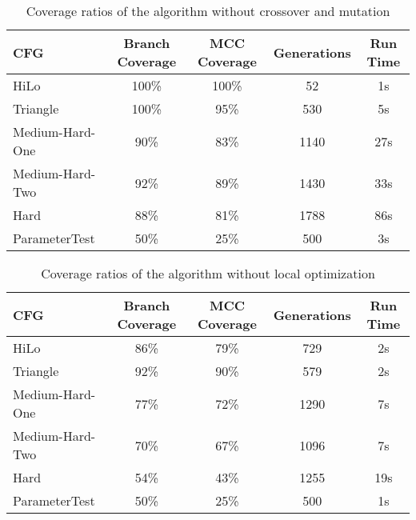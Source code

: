 \documentclass[runningheads]{llncs}
\begin{document}
\begin{table}[h!]
	\begin{center}
		\begin{tabular}{| l | c | c | c | c |}
			\hline
			CFG             & Branch Coverage & MCC Coverage & Generations & Run Time \\ \hline
			HiLo            & 100\%           & 100\%        & 52          & 1s       \\ \hline
			Triangle        & 100\%           & 95\%         & 530         & 5s       \\ \hline
			Medium-Hard-One & 90\%            & 83\%         & 1140        & 27s      \\ \hline
			Medium-Hard-Two & 92\%            & 89\%         & 1430        & 33s      \\ \hline
			Hard            & 88\%            & 81\%         & 1788        & 86s      \\ \hline
			ParameterTest   & 50\%            & 25\%         & 500         & 3s       \\ \hline
		\end{tabular}
	\end{center}
	\caption{Coverage ratios of the algorithm without crossover and mutation}
	\label{tab:CovNoGA}
\end{table}

\begin{table}[h!]
	\begin{center}
		\begin{tabular}{| l | c | c | c | c |}
			\hline
			CFG             & Branch Coverage & MCC Coverage & Generations & Run Time \\ \hline
			HiLo            & 86\%            & 79\%         & 729         & 2s       \\ \hline
			Triangle        & 92\%            & 90\%         & 579         & 2s       \\ \hline
			Medium-Hard-One & 77\%            & 72\%         & 1290        & 7s       \\ \hline
			Medium-Hard-Two & 70\%            & 67\%         & 1096        & 7s       \\ \hline
			Hard            & 54\%            & 43\%         & 1255        & 19s      \\ \hline
			ParameterTest   & 50\%            & 25\%         & 500         & 1s       \\ \hline
		\end{tabular}
	\end{center}
	\caption{Coverage ratios of the algorithm without local optimization}
	\label{tab:CovNoLO}
\end{table}
\end{document}
